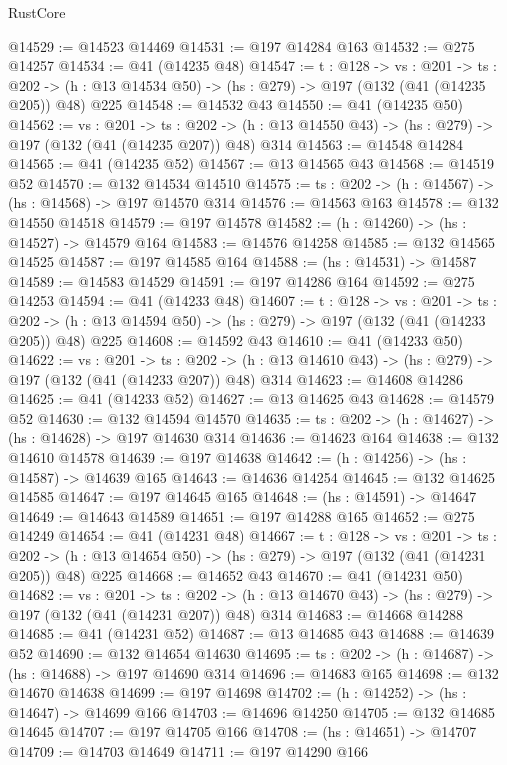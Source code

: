 \begin{lexlean}{RustCore}
\begin{coremodule}
@14529 := @14523 @14469
@14531 := @197 @14284 @163
@14532 := @275 @14257
@14534 := @41 (@14235 @48)
@14547 := {t : @128} ->
  {vs : @201} ->
  {ts : @202} -> (h : @13 @14534 @50) -> (hs : @279) -> @197 (@132 (@41 (@14235 @205)) @48) @225
@14548 := @14532 @43
@14550 := @41 (@14235 @50)
@14562 := {vs : @201} ->
  {ts : @202} -> (h : @13 @14550 @43) -> (hs : @279) -> @197 (@132 (@41 (@14235 @207)) @48) @314
@14563 := @14548 @14284
@14565 := @41 (@14235 @52)
@14567 := @13 @14565 @43
@14568 := @14519 @52
@14570 := @132 @14534 @14510
@14575 := {ts : @202} -> (h : @14567) -> (hs : @14568) -> @197 @14570 @314
@14576 := @14563 @163
@14578 := @132 @14550 @14518
@14579 := @197 @14578
@14582 := (h : @14260) -> (hs : @14527) -> @14579 @164
@14583 := @14576 @14258
@14585 := @132 @14565 @14525
@14587 := @197 @14585 @164
@14588 := (hs : @14531) -> @14587
@14589 := @14583 @14529
@14591 := @197 @14286 @164
@14592 := @275 @14253
@14594 := @41 (@14233 @48)
@14607 := {t : @128} ->
  {vs : @201} ->
  {ts : @202} -> (h : @13 @14594 @50) -> (hs : @279) -> @197 (@132 (@41 (@14233 @205)) @48) @225
@14608 := @14592 @43
@14610 := @41 (@14233 @50)
@14622 := {vs : @201} ->
  {ts : @202} -> (h : @13 @14610 @43) -> (hs : @279) -> @197 (@132 (@41 (@14233 @207)) @48) @314
@14623 := @14608 @14286
@14625 := @41 (@14233 @52)
@14627 := @13 @14625 @43
@14628 := @14579 @52
@14630 := @132 @14594 @14570
@14635 := {ts : @202} -> (h : @14627) -> (hs : @14628) -> @197 @14630 @314
@14636 := @14623 @164
@14638 := @132 @14610 @14578
@14639 := @197 @14638
@14642 := (h : @14256) -> (hs : @14587) -> @14639 @165
@14643 := @14636 @14254
@14645 := @132 @14625 @14585
@14647 := @197 @14645 @165
@14648 := (hs : @14591) -> @14647
@14649 := @14643 @14589
@14651 := @197 @14288 @165
@14652 := @275 @14249
@14654 := @41 (@14231 @48)
@14667 := {t : @128} ->
  {vs : @201} ->
  {ts : @202} -> (h : @13 @14654 @50) -> (hs : @279) -> @197 (@132 (@41 (@14231 @205)) @48) @225
@14668 := @14652 @43
@14670 := @41 (@14231 @50)
@14682 := {vs : @201} ->
  {ts : @202} -> (h : @13 @14670 @43) -> (hs : @279) -> @197 (@132 (@41 (@14231 @207)) @48) @314
@14683 := @14668 @14288
@14685 := @41 (@14231 @52)
@14687 := @13 @14685 @43
@14688 := @14639 @52
@14690 := @132 @14654 @14630
@14695 := {ts : @202} -> (h : @14687) -> (hs : @14688) -> @197 @14690 @314
@14696 := @14683 @165
@14698 := @132 @14670 @14638
@14699 := @197 @14698
@14702 := (h : @14252) -> (hs : @14647) -> @14699 @166
@14703 := @14696 @14250
@14705 := @132 @14685 @14645
@14707 := @197 @14705 @166
@14708 := (hs : @14651) -> @14707
@14709 := @14703 @14649
@14711 := @197 @14290 @166

\end{coremodule}
\end{lexlean}
